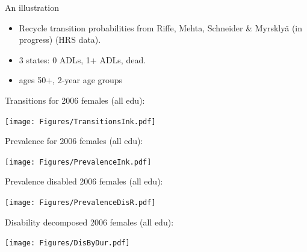 \documentclass[20pt,usenames,dvipsnames]{beamer}
\begin{document}
\begin{frame}[plain]
\Large
\begin{center}
An illustration \vspace{2em}
\pause
\begin{itemize}[<+->]
  \item Recycle transition probabilities from \normalsize{Riffe, Mehta, Schneider \& Myrskly\"a (in progress)} (HRS data).
  \item 3 states: 0 ADLs, 1+ ADLs, dead.
  \item ages 50+, 2-year age groups
\end{itemize}
\end{center}
\end{frame}


\begin{frame}[plain]
\Large
Transitions for 2006 females (all edu):\vspace{-1em}
\begin{center}
\texttt{[image: Figures/TransitionsInk.pdf]}
\end{center}
\end{frame}

\begin{frame}[plain]
\Large
Prevalence for 2006 females (all edu):\vspace{-1em}
\begin{center}
\texttt{[image: Figures/PrevalenceInk.pdf]}
\end{center}
\end{frame}

\begin{frame}[plain]
\Large
Prevalence disabled 2006 females (all edu):\vspace{-1em}
\begin{center}
\texttt{[image: Figures/PrevalenceDisR.pdf]}
\end{center}
\end{frame}

\begin{frame}[plain]
\Large
Disability decomposed 2006 females (all edu):\vspace{-1em}
\begin{center}
\texttt{[image: Figures/DisByDur.pdf]}
\end{center}
\end{frame}
\end{document}
